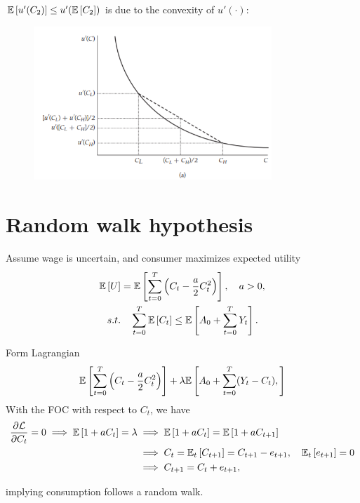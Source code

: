 \documentclass[../main.tex]{subfiles}
\begin{document}
        $\mathbb{E}\left[u'(C_2)\right] \le u'(\mathbb{E}\left[C_2\right])$ is due to the convexity of $u'(\cdot)$:
        \begin{figure}[!ht]
            \centering
            \includegraphics[width=0.8\textwidth]{subfile/attachments/4.1-risk_aversion_utility.png}
        \end{figure}
        
    \section{Random walk hypothesis}
        Assume wage is uncertain, and consumer maximizes expected utility  
        \begin{align}
            \mathbb{E}\left[U\right] &= \mathbb{E}\left[\sum_{t=0}^T \left(C_t - \frac{a}{2} C_t^2 \right)\right],
            \quad a > 0,
            \\ s.t. &\quad
            \sum_{t=0}^T \mathbb{E}\left[C_t\right]
            \le \mathbb{E}\left[A_0 + \sum_{t=0}^T Y_t\right].
        \end{align}
        
        Form Lagrangian
        \begin{align}
            \mathbb{E}\left[\sum_{t=0}^T \left(C_t - \frac{a}{2} C_t^2 \right)\right] + \lambda \mathbb{E}\left[
                A_0 + \sum_{t=0}^T (Y_t-C_t),
            \right]
        \end{align}
        With the FOC with respect to $C_t$, we have
        \begin{align}
            \frac{\partial \mathcal{L}}{\partial C_t} = 0
            \implies
            \mathbb{E}\left[1 + a C_t\right] = \lambda
            &\implies
            \mathbb{E}\left[1 + a C_t\right]
            = \mathbb{E}\left[1 + a C_{t+1}\right]
            \\
            &\implies
            C_t
            = \mathbb{E}_t\left[C_{t+1}\right]
            = C_{t+1} - e_{t+1},
            \quad \mathbb{E}_t\left[e_{t+1}\right] = 0
            \\
            &\implies
            C_{t+1} = C_t + e_{t+1},
        \end{align}
        
        implying consumption follows a random walk.
        
\end{document}
